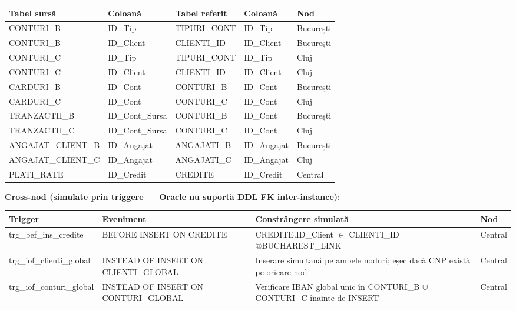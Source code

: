 \documentclass[12pt,a4paper]{article}
\begin{document}
\begin{center}
{\small
\begin{tabular}{p{4.2cm}p{2.5cm}p{3cm}p{2.5cm}p{1.5cm}}
\toprule
\textbf{Tabel sursă} & \textbf{Coloană} & \textbf{Tabel referit} & \textbf{Coloană} & \textbf{Nod} \\
\midrule
CONTURI\_B       & ID\_Tip        & TIPURI\_CONT  & ID\_Tip        & București \\
CONTURI\_B       & ID\_Client     & CLIENTI\_ID   & ID\_Client     & București \\
CONTURI\_C       & ID\_Tip        & TIPURI\_CONT  & ID\_Tip        & Cluj \\
CONTURI\_C       & ID\_Client     & CLIENTI\_ID   & ID\_Client     & Cluj \\
CARDURI\_B       & ID\_Cont       & CONTURI\_B    & ID\_Cont       & București \\
CARDURI\_C       & ID\_Cont       & CONTURI\_C    & ID\_Cont       & Cluj \\
TRANZACTII\_B    & ID\_Cont\_Sursa & CONTURI\_B   & ID\_Cont       & București \\
TRANZACTII\_C    & ID\_Cont\_Sursa & CONTURI\_C   & ID\_Cont       & Cluj \\
ANGAJAT\_CLIENT\_B & ID\_Angajat  & ANGAJATI\_B   & ID\_Angajat    & București \\
ANGAJAT\_CLIENT\_C & ID\_Angajat  & ANGAJATI\_C   & ID\_Angajat    & Cluj \\
PLATI\_RATE      & ID\_Credit     & CREDITE       & ID\_Credit     & Central \\
\bottomrule
\end{tabular}
}
\end{center}

\textbf{Cross-nod (simulate prin triggere — Oracle nu suportă DDL FK inter-instance)}:

\begin{center}
{\small
\begin{tabular}{p{4.5cm}p{3.2cm}p{5.5cm}p{1.5cm}}
\toprule
\textbf{Trigger} & \textbf{Eveniment} & \textbf{Constrângere simulată} & \textbf{Nod} \\
\midrule
trg\_bef\_ins\_credite &
  BEFORE INSERT ON CREDITE &
  CREDITE.ID\_Client $\in$ CLIENTI\_ID @BUCHAREST\_LINK &
  Central \\
trg\_iof\_clienti\_global &
  INSTEAD OF INSERT ON CLIENTI\_GLOBAL &
  Inserare simultană pe ambele noduri; eșec dacă CNP există pe oricare nod &
  Central \\
trg\_iof\_conturi\_global &
  INSTEAD OF INSERT ON CONTURI\_GLOBAL &
  Verificare IBAN global unic în CONTURI\_B $\cup$ CONTURI\_C înainte de INSERT &
  Central \\
\bottomrule
\end{tabular}
}
\end{center}
\end{document}
